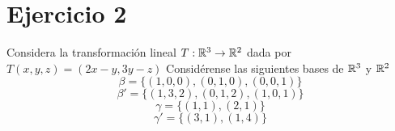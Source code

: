 \section*{Ejercicio 2}

\noindent Considera la transformación lineal $T: \mathbb{R}^{3} \rightarrow \mathbb{R}^{2}$ dada por $T(x,y,z) = (2x-y,3y-z)$ Considérense
las siguientes bases de $\mathbb{R}^{3}$ y $\mathbb{R}^{2}$
\begin{equation*}
    \beta =  \{ (1,0,0), (0,1,0), (0,0,1) \}
\end{equation*}
\begin{equation*}
    \beta' =  \{ (1,3,2), (0,1,2), (1,0,1) \}
\end{equation*}
\begin{equation*}
    \gamma =  \{ (1,1), (2,1) \}
\end{equation*}
\begin{equation*}
    \gamma' =  \{ (3,1), (1,4) \}
\end{equation*}

